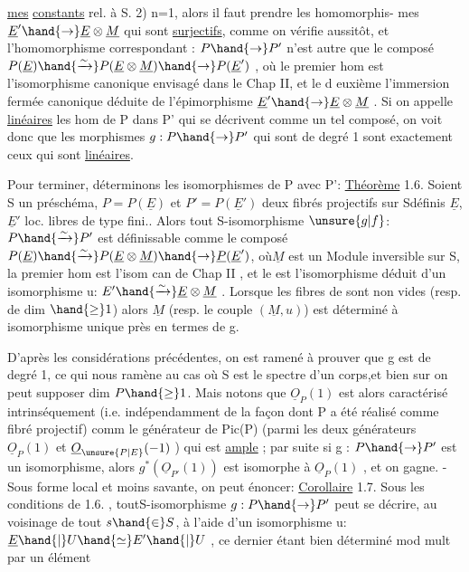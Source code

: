 
\uline{mes} \uline{constants} rel. à S. 2) n=1, alors il faut prendre les homomorphis-%
mes  $\underline{E}'\hand{\to} \underline{E}\otimes\underline{M}$ qui sont \uline{surjectifs}, comme on vérifie
aussitôt, et l'homomorphisme correspondant : $P\hand{\to} P'$ n'est autre que le
composé $P(\underline{E})\hand{\xrightarrow{\sim}}P(\underline{E}\otimes\underline{M})\hand{\to} P(\underline{E}')$ , où le premier hom est l'isomorphisme
canonique envisagé dans le Chap II, et le d euxième l'immersion fermée
canonique déduite de l'épimorphisme $\underline{E}'\hand{\to}\underline{E}\otimes\underline{M}$ . Si on appelle \uline{linéaires}
les hom de P dans P' qui se décrivent comme un tel composé, on voit donc
que les morphismes $g:P\hand{\to} P'$ qui sont de degré 1 sont exactement ceux qui
sont \uline{linéaires}.

Pour terminer, déterminons les isomorphismes de P avec P':
\uline{Théorème} 1.6. Soient S un préschéma, $P=P(\underline{E})$ et $P'=P(\underline{E}')$ deux fibrés
projectifs sur Sdéfinis  $\underline{E}$, $\underline{E}'$ loc. libres de type fini.. Alors tout S-isomorphisme $\unsure{g|f}$: $P\hand{\xrightarrow{\sim}}P'$ est définissable
comme le composé $P(\underline{E})\hand{\xrightarrow{\sim}}P(\underline{E}\otimes\underline{M})\hand{\to} \underline{P}(\underline{E}')$, où$\underline{M}$ est un Module inversible sur S, la premier hom est l'isom
can de Chap II , et le  est l'isomorphisme  déduit
d'un isomorphisme u: $E'\hand{\xrightarrow{\sim}}\underline{E}\otimes\underline{M}$ . Lorsque les fibres de  sont non
vides (resp. de dim $\hand{\geq} 1$) alors $\underline{M}$ (resp. le couple $(\underline{M},u)$) est déterminé
à isomorphisme unique près en termes de g.

D'après les considérations précédentes, on est ramené à prouver
que g est de degré 1, ce qui nous ramène au cas où S est le spectre d'un
corps,et bien sur on peut supposer dim $P\hand{\geq} 1$. Mais notons que $\underline{O}_P(1)$ est alors caractérisé intrinséquement (i.e.
indépendamment de la façon dont P a été réalisé comme fibré projectif)
comm le générateur de Pic(P) (parmi les deux générateurs $\underline{O}_P(1)$ et
$\underline{O}_{\unsure{P|E}}(-1)$ ) qui est \uline{ample} ; par suite si g : $P\hand{\to} P'$ est un isomorphisme,
alors $g^{*}(\underline{O}_{P'}(1))$ est isomorphe à $\underline{O}_P(1)$ , et on gagne. - Sous forme local
et moins savante, on peut énoncer:
\uline{Corollaire} 1.7. Sous les conditions de 1.6. , toutS-isomorphisme $g:P\hand{\to} P'$
peut se décrire, au voisinage de tout $s\hand{\in} S$, à l'aide d'un isomorphisme
u: $\underline{E}\hand{|}U \hand{\simeq} E'\hand{|}U$ , ce dernier étant bien déterminé mod mult par un élément

